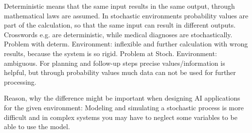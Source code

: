 \documentclass[10pt,a4paper]{article}
\begin{document}
		Deterministic means that the same input results in the same output, through mathematical laws are assumed.
In stochastic environments probability values are part of the calculation, so that the same input can result in different outputs.
Crosswords e.g. are deterministic, while medical diagnoses are stochastically. Problem with determ. Environment: inflexible and further calculation with wrong results, because the system is so rigid. Problem at Stoch. Environment: ambiguous. For planning and follow-up steps precise values/information is helpful, but through probability values much data can not be used for further processing.

Reason, why the difference might be important when designing AI applications for the given environment:
Modeling and simulating a stochastic process is more difficult and in complex systems you may have to neglect some variables to be able to use the model.



		
		
		
\end{document}
